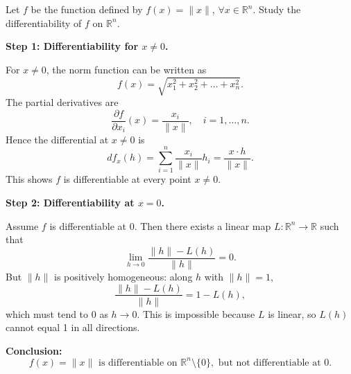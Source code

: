 \documentclass[12pt]{article}
\begin{document}
\section{}
Let $f$ be the function defined by $f(x) = \|x\|$, $\forall x \in \mathbb{R}^n$. Study the differentiability of $f$ on $\mathbb{R}^n$.

\begin{correctionbox}
\textbf{Step 1: Differentiability for \(x\neq 0\).}  

For \(x\neq 0\), the norm function can be written as 
\[
f(x) = \sqrt{x_1^2 + x_2^2 + \dots + x_n^2}.
\]  
The partial derivatives are
\[
\frac{\partial f}{\partial x_i}(x) = \frac{x_i}{\|x\|}, \quad i=1,\dots,n.
\]  
Hence the differential at \(x\neq 0\) is
\[
\boxed{df_x(h) = \sum_{i=1}^{n} \frac{x_i}{\|x\|} h_i = \frac{x\cdot h}{\|x\|}}.
\]  
This shows \(f\) is differentiable at every point \(x\neq 0\).

\medskip
\textbf{Step 2: Differentiability at \(x=0\).}  

Assume \(f\) is differentiable at \(0\). Then there exists a linear map \(L:\mathbb{R}^n\to\mathbb{R}\) such that
\[
\lim_{h\to 0} \frac{\|h\| - L(h)}{\|h\|} = 0.
\]  
But \(\|h\|\) is positively homogeneous: along \(h\) with \(\|h\|=1\),
\[
\frac{\|h\| - L(h)}{\|h\|} = 1 - L(h),
\]  
which must tend to 0 as \(h\to 0\). This is impossible because \(L\) is linear, so \(L(h)\) cannot equal 1 in all directions.  

\medskip
\textbf{Conclusion:}  
\[
f(x) = \|x\| \text{ is differentiable on } \mathbb{R}^n\setminus\{0\}, \text{ but not differentiable at } 0.
\]

\end{correctionbox}
\end{document}
